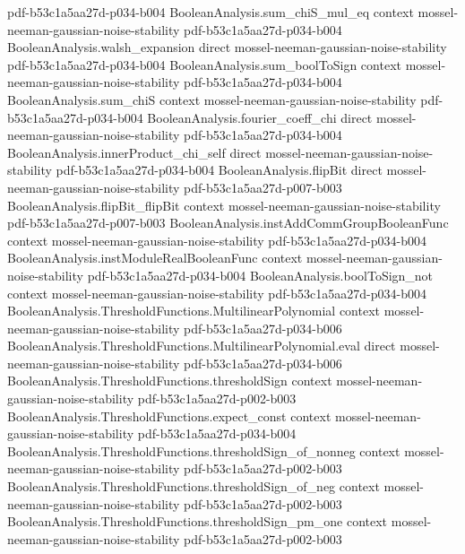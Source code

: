 \begin{theorem}
  {pdf-b53c1a5aa27d-p034-b004}
\proofstep
  {BooleanAnalysis.sum_chiS_mul_eq}
  {context}
  {mossel-neeman-gaussian-noise-stability}
  {pdf-b53c1a5aa27d-p034-b004}
\proofstep
  {BooleanAnalysis.walsh_expansion}
  {direct}
  {mossel-neeman-gaussian-noise-stability}
  {pdf-b53c1a5aa27d-p034-b004}
\proofstep
  {BooleanAnalysis.sum_boolToSign}
  {context}
  {mossel-neeman-gaussian-noise-stability}
  {pdf-b53c1a5aa27d-p034-b004}
\proofstep
  {BooleanAnalysis.sum_chiS}
  {context}
  {mossel-neeman-gaussian-noise-stability}
  {pdf-b53c1a5aa27d-p034-b004}
\proofstep
  {BooleanAnalysis.fourier_coeff_chi}
  {direct}
  {mossel-neeman-gaussian-noise-stability}
  {pdf-b53c1a5aa27d-p034-b004}
\proofstep
  {BooleanAnalysis.innerProduct_chi_self}
  {direct}
  {mossel-neeman-gaussian-noise-stability}
  {pdf-b53c1a5aa27d-p034-b004}
\proofstep
  {BooleanAnalysis.flipBit}
  {direct}
  {mossel-neeman-gaussian-noise-stability}
  {pdf-b53c1a5aa27d-p007-b003}
\proofstep
  {BooleanAnalysis.flipBit_flipBit}
  {context}
  {mossel-neeman-gaussian-noise-stability}
  {pdf-b53c1a5aa27d-p007-b003}
\proofstep
  {BooleanAnalysis.instAddCommGroupBooleanFunc}
  {context}
  {mossel-neeman-gaussian-noise-stability}
  {pdf-b53c1a5aa27d-p034-b004}
\proofstep
  {BooleanAnalysis.instModuleRealBooleanFunc}
  {context}
  {mossel-neeman-gaussian-noise-stability}
  {pdf-b53c1a5aa27d-p034-b004}
\proofstep
  {BooleanAnalysis.boolToSign_not}
  {context}
  {mossel-neeman-gaussian-noise-stability}
  {pdf-b53c1a5aa27d-p034-b004}
\proofstep
  {BooleanAnalysis.ThresholdFunctions.MultilinearPolynomial}
  {context}
  {mossel-neeman-gaussian-noise-stability}
  {pdf-b53c1a5aa27d-p034-b006}
\proofstep
  {BooleanAnalysis.ThresholdFunctions.MultilinearPolynomial.eval}
  {direct}
  {mossel-neeman-gaussian-noise-stability}
  {pdf-b53c1a5aa27d-p034-b006}
\proofstep
  {BooleanAnalysis.ThresholdFunctions.thresholdSign}
  {context}
  {mossel-neeman-gaussian-noise-stability}
  {pdf-b53c1a5aa27d-p002-b003}
\proofstep
  {BooleanAnalysis.ThresholdFunctions.expect_const}
  {context}
  {mossel-neeman-gaussian-noise-stability}
  {pdf-b53c1a5aa27d-p034-b004}
\proofstep
  {BooleanAnalysis.ThresholdFunctions.thresholdSign_of_nonneg}
  {context}
  {mossel-neeman-gaussian-noise-stability}
  {pdf-b53c1a5aa27d-p002-b003}
\proofstep
  {BooleanAnalysis.ThresholdFunctions.thresholdSign_of_neg}
  {context}
  {mossel-neeman-gaussian-noise-stability}
  {pdf-b53c1a5aa27d-p002-b003}
\proofstep
  {BooleanAnalysis.ThresholdFunctions.thresholdSign_pm_one}
  {context}
  {mossel-neeman-gaussian-noise-stability}
  {pdf-b53c1a5aa27d-p002-b003}
\proofstep

\end{theorem}
